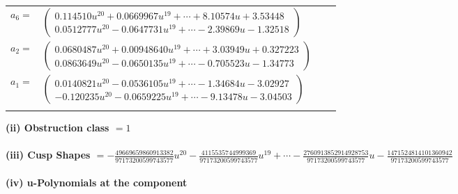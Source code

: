 \documentclass[1p]{elsarticle_modified}
\theoremstyle{definition}
\begin{document}
\begin{tabular}{m{7pt} m{180pt} m{7pt} m{180pt} }
\flushright $a_{6}=$&$\begin{pmatrix}0.114510 u^{20}+0.0669967 u^{19}+\cdots+8.10574 u+3.53448\\0.0512777 u^{20}-0.0647731 u^{19}+\cdots-2.39869 u-1.32518\end{pmatrix}$ \\
\flushright $a_{2}=$&$\begin{pmatrix}0.0680487 u^{20}+0.00948640 u^{19}+\cdots+3.03949 u+0.327223\\0.0863649 u^{20}-0.0650135 u^{19}+\cdots-0.705523 u-1.34773\end{pmatrix}$ \\
\flushright $a_{1}=$&$\begin{pmatrix}0.0140821 u^{20}-0.0536105 u^{19}+\cdots-1.34684 u-3.02927\\-0.120235 u^{20}-0.0659225 u^{19}+\cdots-9.13478 u-3.04503\end{pmatrix}$\\&\end{tabular}
\flushleft \textbf{(ii) Obstruction class $= 1$}\\~\\
\flushleft \textbf{(iii) Cusp Shapes $= -\frac{49669659860913382}{97173200599743577} u^{20}-\frac{4115535744999369}{97173200599743577} u^{19}+\cdots-\frac{2760913852914928753}{97173200599743577} u-\frac{1471524814101360942}{97173200599743577}$}\\~\\
\newpage\renewcommand{\arraystretch}{1}
\flushleft \textbf{(iv) u-Polynomials at the component}\newline \\
\end{document}
